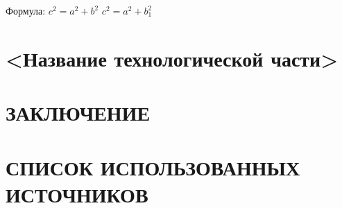 \documentclass[utf8x, 14pt, oneside, a4paper]{article}
\begin{document}
	Формула: $c^{2}=a^{2}+b^{2}$
	\begin{math}
		c^2 = a^2 + b_1^2
	\end{math}
		\pagebreak

	\section{<Название технологической части>}

		\pagebreak

	\section*{ЗАКЛЮЧЕНИЕ}

		\pagebreak

	\section*{СПИСОК ИСПОЛЬЗОВАННЫХ ИСТОЧНИКОВ}

		\pagebreak
\end{document}
